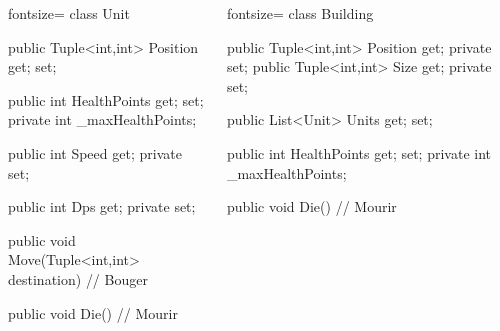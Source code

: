 \begin{frame}[fragile]
  \begin{columns}[c]
    \column{2.3in}
    \begin{csharpcode*}{fontsize=\tiny}
class Unit
{
    public Tuple<int,int> Position { get; set; }

    public int HealthPoints { get; set; }
    private int _maxHealthPoints;

    public int Speed { get; private set; }

    public int Dps { get; private set; }

    public void Move(Tuple<int,int> destination)
    {
        // Bouger
    }

    public void Die()
    {
        // Mourir
    }
}
    \end{csharpcode*}
    \column{2.5in}
    \begin{csharpcode*}{fontsize=\tiny}
class Building
{
    public Tuple<int,int> Position { get; private set; }
    public Tuple<int,int> Size { get; private set; }

    public List<Unit> Units { get; set; }

    public int HealthPoints { get; set; }
    private int _maxHealthPoints;

    public void Die()
    {
        // Mourir
    }
}
    \end{csharpcode*}
  \end{columns}
\end{frame}

